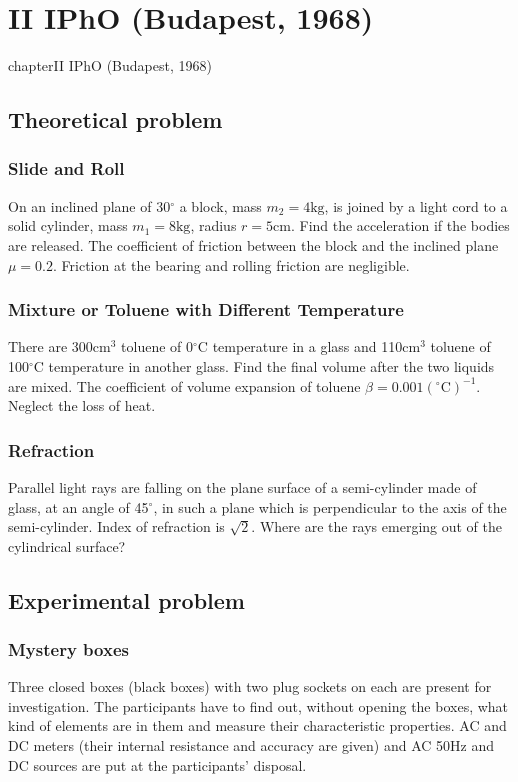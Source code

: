 \documentclass[12pt,a4paper]{book}
\begin{document}
\chapter*{II IPhO (Budapest, 1968)}
{chapter}{II IPhO (Budapest, 1968)}
\section*{Theoretical problem}
	\subsection*{Slide and Roll}
	On an inclined plane of 30$^{\circ}$ a block, mass $m_2=4\text{kg}$, is joined by a light cord to a solid cylinder, mass $m_1=8\text{kg}$, radius $r=5\text{cm}$. Find the acceleration if the bodies are released. The coef\mbox{}f\mbox{}icient of friction between the block and the inclined plane $\mu=0.2$. Friction at the bearing and rolling friction are negligible.
	\subsection*{Mixture or Toluene with Dif\mbox{}ferent Temperature}
	There are 300$\text{cm}^3$ toluene of 0$^{\circ}\mathrm{C}$ temperature in a glass and 110$\text{cm}^3$ toluene of 100$^{\circ}\mathrm{C}$ temperature in another glass. Find the final volume after the two liquids are mixed. The coefficient of volume expansion of toluene $\beta=0.001(^{\circ}\mathrm{C})^{-1}$. Neglect the loss of heat.
	\subsection*{Refraction}
	Parallel light rays are falling on the plane surface of a semi-cylinder made of glass, at an angle of 45$^{\circ}$, in such a plane which is perpendicular to the axis of the semi-cylinder. Index of refraction is $\sqrt{2}$. Where are the rays emerging out of the cylindrical surface?
\section*{Experimental problem}
	\subsection*{Mystery boxes}
	Three closed boxes (black boxes) with two plug sockets on each are present for investigation. The participants have to f\mbox{}ind out, without opening the boxes, what kind of elements are in them and measure their characteristic properties. AC and DC meters (their internal resistance and accuracy are given) and AC 50Hz and DC sources are put at the participants' disposal.
\end{document}

